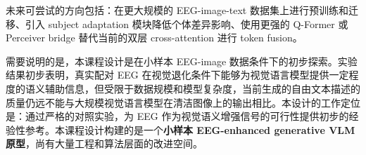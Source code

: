 未来可尝试的方向包括：在更大规模的 EEG-image-text 数据集上进行预训练和迁移、引入 subject adaptation 模块降低个体差异影响、使用更强的 Q-Former 或 Perceiver bridge 替代当前的双层 cross-attention 进行 token fusion。

需要说明的是，本课程设计是在小样本 EEG-image 数据条件下的初步探索。实验结果初步表明，真实配对 EEG 在视觉退化条件下能够为视觉语言模型提供一定程度的语义辅助信息，但受限于数据规模和模型复杂度，当前生成的自由文本描述的质量仍远不能与大规模视觉语言模型在清洁图像上的输出相比。本设计的工作定位是：通过严格的对照实验，为 EEG 作为视觉语义增强信号的可行性提供初步的经验性参考。本课程设计构建的是一个\textbf{小样本 EEG-enhanced generative VLM 原型}，尚有大量工程和算法层面的改进空间。

